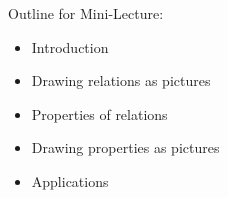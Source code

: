 \documentclass[10pt]{beamer}
\begin{document}
%
%	
%    
%
%


\begin{frame}[standout]
Outline for Mini-Lecture:
\begin{itemize}
\item \alert{\textbullet \quad Introduction}
\item \textbullet \quad Drawing relations as pictures 
\item \textbullet \quad Properties of relations 
\item \textbullet \quad Drawing properties as pictures
\item \textbullet \quad Applications
\end{itemize}
\end{frame}
\end{document}

